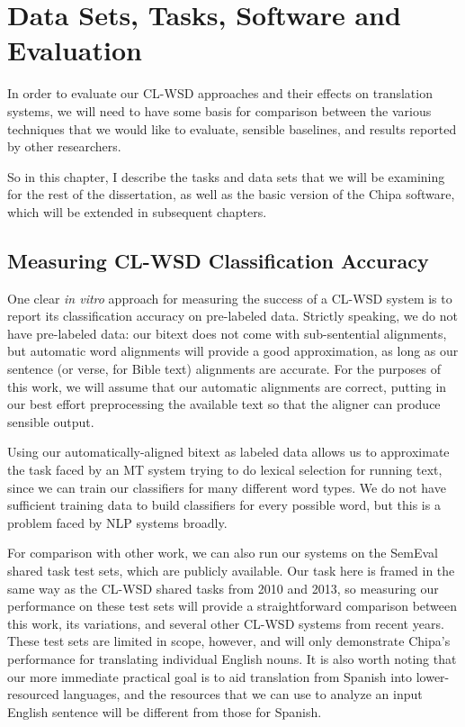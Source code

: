 \chapter{Data Sets, Tasks, Software and Evaluation}
\label{chap:evaluation}
In order to evaluate our CL-WSD approaches and their effects on translation
systems, we will need to have some basis for comparison between the various
techniques that we would like to evaluate, sensible baselines, and results
reported by other researchers.

So in this chapter, I describe the tasks and data sets that we will be
examining for the rest of the dissertation, as well as the basic version of the
Chipa software, which will be extended in subsequent chapters.

\section{Measuring CL-WSD Classification Accuracy}
One clear \emph{in vitro} approach for measuring the success of a CL-WSD system
is to report its classification accuracy on pre-labeled data. Strictly
speaking, we do not have pre-labeled data: our bitext does not
come with sub-sentential alignments, but automatic word alignments will provide
a good approximation, as long as our sentence (or verse, for Bible text)
alignments are accurate. For the purposes of this work, we will assume that our
automatic alignments are correct, putting in our best effort preprocessing
the available text so that the aligner can produce sensible output.

Using our automatically-aligned bitext as labeled data allows us to approximate
the task faced by an MT system trying to do lexical selection for running text,
since we can train our classifiers for many different word types. We do not
have sufficient training data to build classifiers for every possible word, but
this is a problem faced by NLP systems broadly.

For comparison with other work, we can also run our systems on the SemEval
shared task test sets, which are publicly available. Our task here is framed in
the same way as the CL-WSD shared tasks from 2010 and 2013, so measuring our
performance on these test sets will provide a straightforward comparison
between this work, its variations, and several other CL-WSD systems from recent
years.  These test sets are limited in scope, however, and will only
demonstrate Chipa's performance for translating individual English nouns.
It is also worth noting that our more immediate practical goal is to aid
translation from Spanish into lower-resourced languages, and the resources that
we can use to analyze an input English sentence will be different from those
for Spanish.

